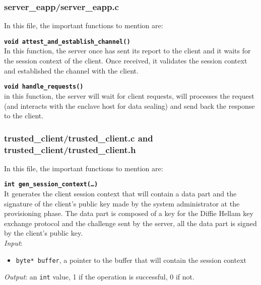 \subsubsection{server\_eapp/server\_eapp.c}
In this file, the important functions to mention are:

\noindent
\texttt{\bfseries void attest\_and\_establish\_channel()}\\
In this function, the server once has sent its report to the client and it waits for the session context of the client. Once received, it validates the session context and established the channel with the client.

\noindent
\texttt{\bfseries void handle\_requests()}\\
in this function, the server will wait for client requests, will processes the request (and interacts with the enclave host for data sealing) and send back the response to the client.





\subsubsection{trusted\_client/trusted\_client.c and trusted\_client/trusted\_client.h}
In this file, the important functions to mention are:

\noindent
\texttt{\bfseries int gen\_session\_context(\dots)}\\
It generates the client session context that will contain a data part and the signature of the client's public key made by the system administrator at the provisioning phase. The data part is composed of a key for the Diffie Hellam key exchange protocol and the challenge sent by the server, all the data part is signed by the client's public key. \\
\textit{Input}:
\begin{itemize}[noitemsep,nolistsep]
  \item \texttt{byte* buffer}, a pointer to the buffer that will contain the session context
\end{itemize}
\textit{Output}: an \texttt{int} value, 1 if the operation is successful, 0 if not. \\


